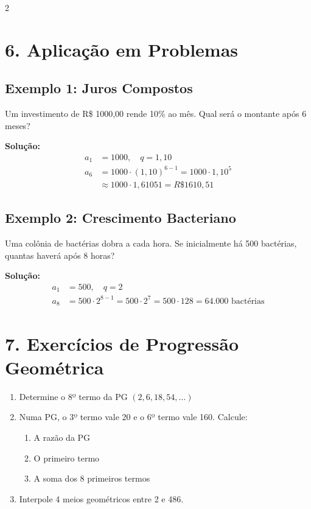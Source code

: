 \documentclass[11pt]{article}
\begin{document}
\begin{multicols}{2}
\section*{6. Aplicação em Problemas}
\subsection*{Exemplo 1: Juros Compostos}
Um investimento de R\$ 1000,00 rende 10\% ao mês. Qual será o montante após 6 meses?

\textbf{Solução:}
\small{
\begin{align*}
a_1 &= 1000,\quad q = 1,10 \\
    a_6 &= 1000 \cdot (1,10)^{6-1} = 1000 \cdot 1,10^5 \\ 
    & \approx 1000 \cdot 1,61051 = R\$ 1610,51
\end{align*}
}

\subsection*{Exemplo 2: Crescimento Bacteriano}
Uma colônia de bactérias dobra a cada hora. Se inicialmente há 500 bactérias, quantas haverá após 8 horas?

\textbf{Solução:}
\begin{align*}
a_1 &= 500,\quad q = 2 \\
a_8 &= 500 \cdot 2^{8-1} = 500 \cdot 2^7 = 500 \cdot 128 = 64.000 \text{ bactérias}
\end{align*}

\section*{7. Exercícios de Progressão Geométrica}

\begin{enumerate}[leftmargin=*]

\item Determine o 8º termo da PG $(2, 6, 18, 54, \ldots)$

\item Numa PG, o 3º termo vale 20 e o 6º termo vale 160. Calcule:
\begin{enumerate}[label=\alph*)]
\item A razão da PG
\item O primeiro termo
\item A soma dos 8 primeiros termos
\end{enumerate}

\item Interpole 4 meios geométricos entre 2 e 486.


\end{enumerate}
\end{multicols}
\end{document}

